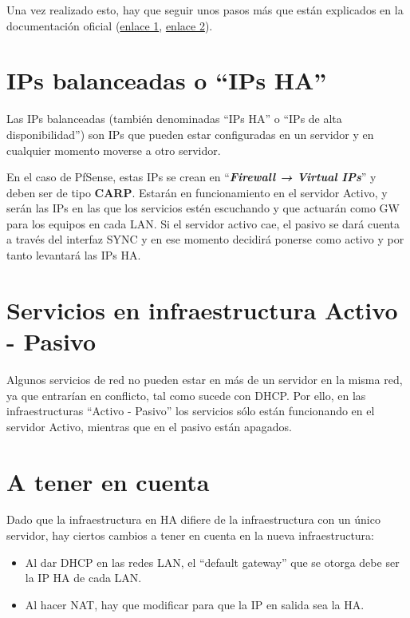 Una vez realizado esto, hay que seguir unos pasos más que están explicados en la documentación oficial (\href{https://docs.netgate.com/pfsense/en/latest/solutions/reference/highavailability/clusterconfiguration.html}{enlace 1}, \href{https://docs.netgate.com/pfsense/en/latest/recipes/high-availability.html}{enlace 2}).


\section{IPs balanceadas o “IPs HA”}
Las IPs balanceadas (también denominadas “IPs HA” o “IPs de alta disponibilidad”) son IPs que pueden estar configuradas en un servidor y en cualquier momento moverse a otro servidor.

En el caso de PfSense, estas IPs se crean en “\textbf{\textit{Firewall → Virtual IPs}}” y deben ser de tipo \textbf{CARP}. Estarán en funcionamiento en el servidor Activo, y serán las IPs en las que los servicios estén escuchando y que actuarán como GW para los equipos en cada LAN. Si el servidor activo cae, el pasivo se dará cuenta a través del interfaz SYNC y en ese momento decidirá ponerse como activo y por tanto levantará las IPs HA.


\section{Servicios en infraestructura Activo - Pasivo}
Algunos servicios de red no pueden estar en más de un servidor en la misma red, ya que entrarían en conflicto, tal como sucede con DHCP. Por ello, en las infraestructuras “Activo - Pasivo” los servicios sólo están funcionando en el servidor Activo, mientras que en el pasivo están apagados.


\section{A tener en cuenta}
Dado que la infraestructura en HA difiere de la infraestructura con un único servidor, hay ciertos cambios a tener en cuenta en la nueva infraestructura:

\begin{itemize}
    \item Al dar DHCP en las redes LAN, el “default gateway” que se otorga debe ser la IP HA de cada LAN.
    \item Al hacer NAT, hay que modificar para que la IP en salida sea la HA.
\end{itemize}

